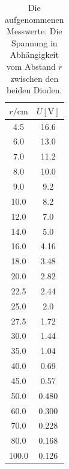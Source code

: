 \begin{table}
  \centering
  \caption{Die aufgenommenen Messwerte. Die Spannung in Abhängigkeit vom Abstand $r$ zwischen den beiden Dioden. } 
  \label{tab:data_dioden}
  \begin{tabular}{c c}
    \toprule
    $r / \si{\centi\metre}$ & $U [\si{\volt}]$\\
    \midrule
    4.5    &   16.6  \\
  6.0    &   13.0  \\
  7.0    &   11.2  \\
  8.0    &   10.0  \\
  9.0    &   9.2   \\
  10.0   &   8.2   \\
  12.0   &   7.0   \\
  14.0   &   5.0   \\
  16.0   &   4.16  \\
  18.0   &   3.48  \\
  20.0   &   2.82  \\
  22.5   &   2.44  \\
  25.0   &   2.0   \\
  27.5   &   1.72  \\
  30.0   &   1.44  \\
  35.0   &   1.04  \\
  40.0   &   0.69  \\
  45.0   &   0.57  \\
  50.0   &   0.480  \\
  60.0   &   0.300  \\
  70.0   &   0.228  \\
  80.0   &   0.168  \\
  100.0  &   0.126  \\
    \bottomrule
  \end{tabular}
\end{table}

